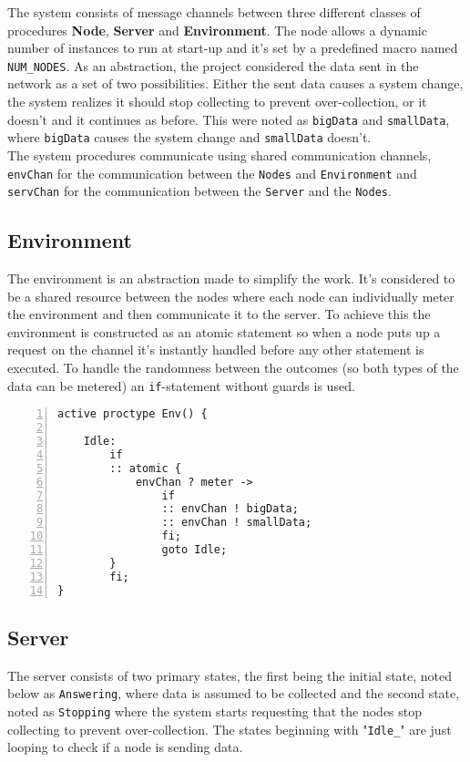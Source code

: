 The system consists of message channels between three different classes of procedures \textbf{Node}, \textbf{Server} and \textbf{Environment}. The node allows a dynamic number of instances to run at start-up and it's set by a predefined macro named \texttt{NUM\_NODES}. As an abstraction, the project considered the data sent in the network as a set of two possibilities. Either the sent data causes a system change, the system realizes it should stop collecting to prevent over-collection, or it doesn't and it continues as before. This were noted as \texttt{bigData} and \texttt{smallData}, where \texttt{bigData} causes the system change and \texttt{smallData} doesn't. \\

The system procedures communicate using shared communication channels, \texttt{envChan} for the communication between the \texttt{Nodes} and \texttt{Environment} and \texttt{servChan} for the communication between the \texttt{Server} and the \texttt{Nodes}.

\subsection{Environment}

The environment is an abstraction made to simplify the work. It's considered to be a shared resource between the nodes where each node can individually meter the environment and then communicate it to the server. To achieve this the environment is constructed as an atomic statement so when a node puts up a request on the channel it's instantly handled before any other statement is executed. To handle the randomness between the outcomes (so both types of the data can be metered) an \texttt{if}-statement without guards is used. 

\begin{lstlisting}[caption=Environment code,language=Promela, numbers=left, basicstyle=\footnotesize, tabsize=2]
active proctype Env() {

	Idle:  
		if
		:: atomic { 
			envChan ? meter ->  
				if
				:: envChan ! bigData;
				:: envChan ! smallData;
				fi; 
				goto Idle;
		}
		fi;
}
\end{lstlisting}

\subsection{Server}

The server consists of two primary states, the first being the initial state, noted below as \texttt{Answering}, where data is assumed to be collected and the second state, noted as \texttt{Stopping} where the system starts requesting that the nodes stop collecting to prevent over-collection. The states beginning with "\texttt{Idle\_}" are just looping to check if a node is sending data.

